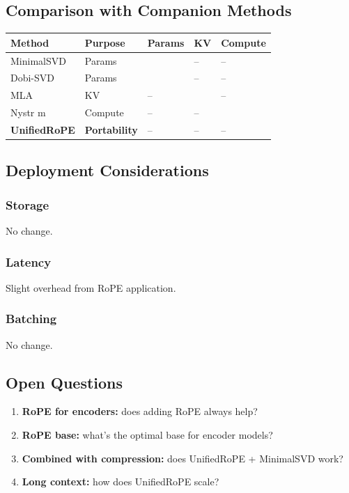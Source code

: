 \subsection{Comparison with Companion Methods}

\begin{table}[H]
\centering
\small
\begin{tabular}{lllll}
\toprule
\textbf{Method} & \textbf{Purpose} & \textbf{Params} & \textbf{KV} & \textbf{Compute} \\
\midrule
MinimalSVD & Params &  & -- & -- \\
Dobi-SVD & Params &  & -- & -- \\
MLA & KV & -- &  & -- \\
Nystr m & Compute & -- & -- &  \\
\textbf{UnifiedRoPE} & \textbf{Portability} & -- & -- & -- \\
\bottomrule
\end{tabular}
\end{table}

\subsection{Deployment Considerations}

\subsubsection{Storage}
No change.

\subsubsection{Latency}
Slight overhead from RoPE application.

\subsubsection{Batching}
No change.

\subsection{Open Questions}

\begin{enumerate}
\item \textbf{RoPE for encoders:} does adding RoPE always help?
\item \textbf{RoPE base:} what's the optimal base for encoder models?
\item \textbf{Combined with compression:} does UnifiedRoPE + MinimalSVD work?
\item \textbf{Long context:} how does UnifiedRoPE scale?

\end{enumerate}
